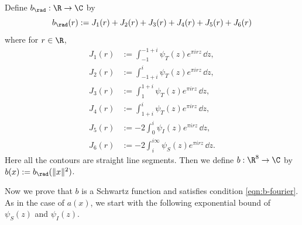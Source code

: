 \begin{definition}\label{def:b-definition}\leanok
Define $b_\rad : \R \to \C$ by
\begin{equation}\label{eqn:b-rad-definition}
    b_\rad(r) := J_1(r) + J_2(r) + J_3(r) + J_4(r) + J_5(r) + J_6(r)
\end{equation}
where for $r \in \R$,
\begin{align}
    J_1(r) &:= \int_{-1}^{-1 + i} \psi_T(z) e^{\pi i r z} \, \dd z, \label{eqn:J1} \\
    J_2(r) &:= \int_{-1 + i}^{i} \psi_T(z) e^{\pi i r z} \, \dd z, \label{eqn:J2} \\
    J_3(r) &:= \int_{1}^{1 + i} \psi_T(z) e^{\pi i r z} \, \dd z, \label{eqn:J3} \\
    J_4(r) &:= \int_{1 + i}^{i} \psi_T(z) e^{\pi i r z} \, \dd z, \label{eqn:J4} \\
    J_5(r) &:= -2 \int_{0}^{i} \psi_I(z) e^{\pi i r z} \, \dd z, \label{eqn:J5} \\
    J_6(r) &:= -2 \int_{i}^{i \infty} \psi_S(z) e^{\pi i r z} \, \dd z. \label{eqn:J6}
\end{align}
Here all the contours are straight line segments.
Then we define $b : \R^8 \to \C$ by $b(x) := b_\rad(\|x\|^2)$.
\end{definition}

Now we prove that $b$ is a Schwartz function and satisfies condition \eqref{eqn:b-fourier}.
As in the case of $a(x)$, we start with the following exponential bound of $\psi_S(z)$ and $\psi_I(z)$.



